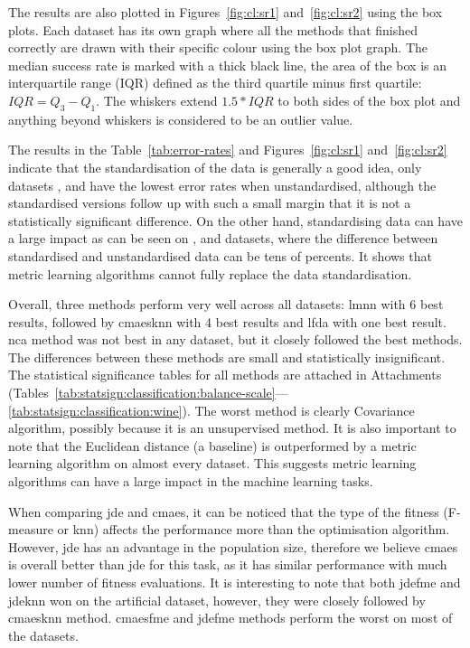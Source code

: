 \documentclass[12pt,a4paper]{report}
\begin{document}


The results are also plotted in Figures~\ref{fig:cl:sr1} and~\ref{fig:cl:sr2} using the box plots. Each dataset has its own graph where all the methods that finished correctly are drawn with their specific colour using the box plot graph. The median success rate is marked with a thick black line, the area of the box is an interquartile range (IQR) defined as the third quartile minus first quartile: $IQR = Q_3 - Q_1$. The whiskers extend $1.5*IQR$ to both sides of the box plot and anything beyond whiskers is considered to be an outlier value.

The results in the Table~\ref{tab:error-rates} and Figures~\ref{fig:cl:sr1} and~\ref{fig:cl:sr2} indicate that the standardisation of the data is generally a good idea, only datasets ,  and  have the lowest error rates when unstandardised, although the standardised versions follow up with such a small margin that it is not a statistically significant difference. On the other hand, standardising data can have a large impact as can be seen on ,  and  datasets, where the difference between standardised and unstandardised data can be tens of percents. It shows that metric learning algorithms cannot fully replace the data standardisation.

Overall, three methods perform very well across all datasets: \ac{lmnn} with 6 best results, followed by \ac{cmaesknn} with 4 best results and \ac{lfda} with one best result. \ac{nca} method was not best in any dataset, but it closely followed the best methods. The differences between these methods are small and statistically insignificant. The statistical significance tables for all methods are attached in Attachments (Tables~\ref{tab:statsign:classification:balance-scale}---\ref{tab:statsign:classification:wine}). The worst method is clearly Covariance algorithm, possibly because it is an unsupervised method. It is also important to note that the Euclidean distance (a baseline) is outperformed by a metric learning algorithm on almost every dataset. This suggests metric learning algorithms can have a large impact in the machine learning tasks.

When comparing \ac{jde} and \ac{cmaes}, it can be noticed that the type of the fitness (\mbox{F-measure} or \ac{knn}) affects the performance more than the optimisation algorithm. However, \ac{jde} has an advantage in the population size, therefore we believe \ac{cmaes} is overall better than \ac{jde} for this task, as it has similar performance with much lower number of fitness evaluations. It is interesting to note that both \ac{jdefme} and \ac{jdeknn} won on the artificial  dataset, however, they were closely followed by \ac{cmaesknn} method. \ac{cmaesfme} and \ac{jdefme} methods perform the worst on most of the datasets.
\end{document}
